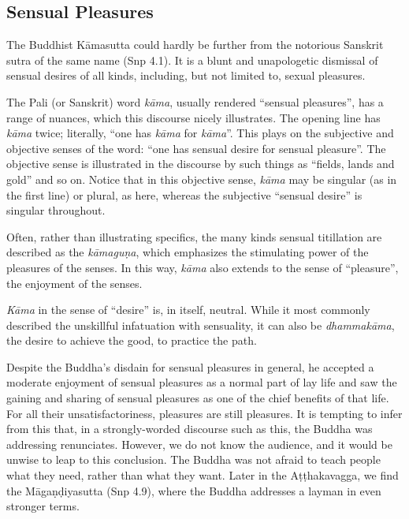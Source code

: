 \documentclass[12pt,openany]{book}%
\begin{document}
\subsection*{Sensual Pleasures}

The Buddhist \textsanskrit{Kāmasutta} could hardly be further from the notorious Sanskrit sutra of the same name (Snp 4.1). It is a blunt and unapologetic dismissal of sensual desires of all kinds, including, but not limited to, sexual pleasures.

The Pali (or Sanskrit) word \textit{\textsanskrit{kāma}}, usually rendered “sensual pleasures”, has a range of nuances, which this discourse nicely illustrates. The opening line has \textit{\textsanskrit{kāma}} twice; literally, “one has \textit{\textsanskrit{kāma}} for \textit{\textsanskrit{kāma}}”. This plays on the subjective and objective senses of the word: “one has sensual desire for sensual pleasure”. The objective sense is illustrated in the discourse by such things as “fields, lands and gold” and so on. Notice that in this objective sense, \textit{\textsanskrit{kāma}} may be singular (as in the first line) or plural, as here, whereas the subjective “sensual desire” is singular throughout.

Often, rather than illustrating specifics, the many kinds sensual titillation are described as the \textit{\textsanskrit{kāmaguṇa}}, which emphasizes the stimulating power of the pleasures of the senses. In this way, \textit{\textsanskrit{kāma}} also extends to the sense of “pleasure”, the enjoyment of the senses.

\textit{\textsanskrit{Kāma}} in the sense of “desire” is, in itself, neutral. While it most commonly described the unskillful infatuation with sensuality, it can also be \textit{\textsanskrit{dhammakāma}}, the desire to achieve the good, to practice the path.

Despite the Buddha’s disdain for sensual pleasures in general, he accepted a moderate enjoyment of sensual pleasures as a normal part of lay life and saw the gaining and sharing of sensual pleasures as one of the chief benefits of that life. For all their unsatisfactoriness, pleasures are still pleasures. It is tempting to infer from this that, in a strongly-worded discourse such as this, the Buddha was addressing renunciates. However, we do not know the audience, and it would be unwise to leap to this conclusion. The Buddha was not afraid to teach people what they need, rather than what they want. Later in the \textsanskrit{Aṭṭhakavagga}, we find the \textsanskrit{Māgaṇḍiyasutta} (Snp 4.9), where the Buddha addresses a layman in even stronger terms.
\end{document}
